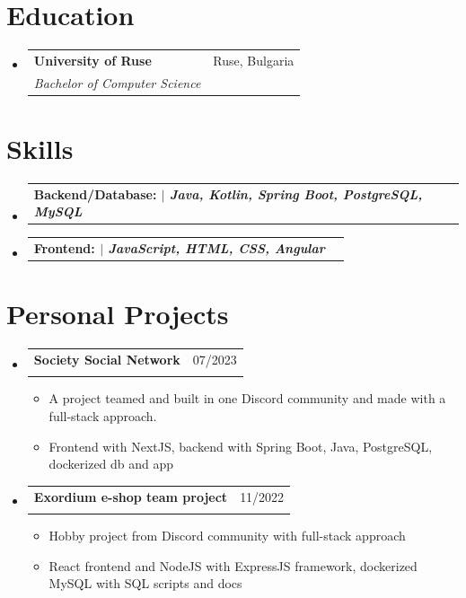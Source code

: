 \documentclass[letterpaper,11pt]{article}
\makeatletter
\newcommand{\resumeItem}[1]{
  \item\small{
    {#1 \vspace{-2pt}}
  }
}
\newcommand{\resumeSubheading}[4]{
  \vspace{-2pt}\item
    \begin{tabular*}{0.97\textwidth}[t]{l@{\extracolsep{\fill}}r}
      \textbf{#1} & #2 \\
      \textit{\small#3} & \textit{\small #4} \\
    \end{tabular*}\vspace{-7pt}
}
\newcommand{\resumeProjectHeading}[2]{
    \item
    \begin{tabular*}{0.97\textwidth}{l@{\extracolsep{\fill}}r}
      \small\textbf{#1} & #2 \\
    \end{tabular*}\vspace{-7pt}
}
\newcommand{\resumeSubHeadingListStart}{\begin{itemize}[leftmargin=0.15in, label={}]}
\newcommand{\resumeSubHeadingListEnd}{\end{itemize}}
\newcommand{\resumeItemListStart}{\begin{itemize}}
\newcommand{\resumeItemListEnd}{\end{itemize}\vspace{-5pt}}
\makeatother
\begin{document}
\section{Education}
\resumeSubHeadingListStart
    \resumeSubheading
      {University of Ruse}{Ruse, Bulgaria}
      {Bachelor of Computer Science}{}
\resumeSubHeadingListEnd

\section{Skills}
\resumeSubHeadingListStart
    \resumeProjectHeading
          {Backend/Database: $|$ \emph{Java, Kotlin, Spring Boot, PostgreSQL, MySQL}}{}
        \resumeProjectHeading
          {Frontend: $|$ \emph{JavaScript, HTML, CSS, Angular}}{}
\resumeSubHeadingListEnd

\section{Personal Projects}
\resumeSubHeadingListStart
    \resumeSubheading
      {Society Social Network}{07/2023}{}{}
      \resumeItemListStart
        \resumeItem{A project teamed and built in one Discord community and made with a full-stack approach.}
        \resumeItem{Frontend with NextJS, backend with Spring Boot, Java, PostgreSQL, dockerized db and app }
      \resumeItemListEnd
          \resumeSubheading
      {Exordium e-shop team project}{11/2022}{}{}
      \resumeItemListStart
        \resumeItem{Hobby project from Discord community with full-stack approach }
        \resumeItem{React frontend and NodeJS with ExpressJS framework, dockerized MySQL with SQL scripts and docs  }
      \resumeItemListEnd
\resumeSubHeadingListEnd
\end{document}
